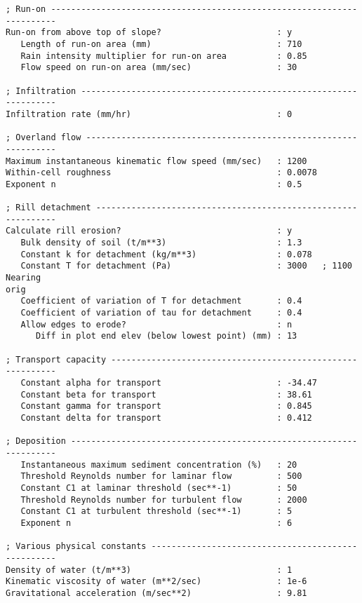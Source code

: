 \begin{verbatim}
; Run-on -----------------------------------------------------------------------
Run-on from above top of slope?                       : y
   Length of run-on area (mm)                         : 710
   Rain intensity multiplier for run-on area          : 0.85
   Flow speed on run-on area (mm/sec)                 : 30

; Infiltration -----------------------------------------------------------------
Infiltration rate (mm/hr)                             : 0

; Overland flow ----------------------------------------------------------------
Maximum instantaneous kinematic flow speed (mm/sec)   : 1200
Within-cell roughness                                 : 0.0078
Exponent n                                            : 0.5

; Rill detachment --------------------------------------------------------------
Calculate rill erosion?                               : y
   Bulk density of soil (t/m**3)                      : 1.3
   Constant k for detachment (kg/m**3)                : 0.078
   Constant T for detachment (Pa)                     : 3000   ; 1100 Nearing
orig
   Coefficient of variation of T for detachment       : 0.4
   Coefficient of variation of tau for detachment     : 0.4
   Allow edges to erode?                              : n
      Diff in plot end elev (below lowest point) (mm) : 13

; Transport capacity -----------------------------------------------------------
   Constant alpha for transport                       : -34.47
   Constant beta for transport                        : 38.61
   Constant gamma for transport                       : 0.845
   Constant delta for transport                       : 0.412

; Deposition -------------------------------------------------------------------
   Instantaneous maximum sediment concentration (%)   : 20
   Threshold Reynolds number for laminar flow         : 500
   Constant C1 at laminar threshold (sec**-1)         : 50
   Threshold Reynolds number for turbulent flow       : 2000
   Constant C1 at turbulent threshold (sec**-1)       : 5
   Exponent n                                         : 6

; Various physical constants ---------------------------------------------------
Density of water (t/m**3)                             : 1
Kinematic viscosity of water (m**2/sec)               : 1e-6
Gravitational acceleration (m/sec**2)                 : 9.81

\end{verbatim}
